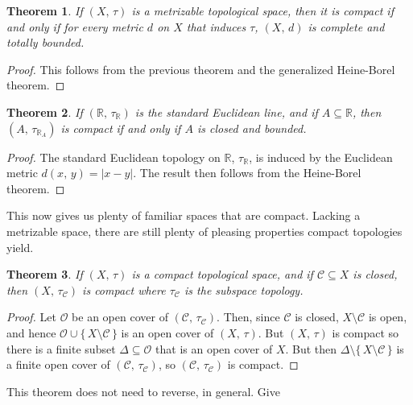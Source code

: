 \documentclass{article}
\theoremstyle{plain}
\newtheorem{theorem}{Theorem}[section]
\theoremstyle{normal}
\begin{document}
        \begin{theorem}
            If $(X,\,\tau)$ is a metrizable topological space, then it is
            compact if and only if for every metric $d$ on $X$ that induces
            $\tau$, $(X,\,d)$ is complete and totally bounded.
        \end{theorem}
        \begin{proof}
            This follows from the previous theorem and the generalized
            Heine-Borel theorem.
        \end{proof}
        \begin{theorem}
            If $(\mathbb{R},\,\tau_{\mathbb{R}})$ is the standard Euclidean
            line, and if $A\subseteq\mathbb{R}$, then
            $(A,\,\tau_{\mathbb{R}_{A}})$ is compact if and only if $A$ is
            closed and bounded.
        \end{theorem}
        \begin{proof}
            The standard Euclidean topology on $\mathbb{R}$,
            $\tau_{\mathbb{R}}$, is induced by the Euclidean metric
            $d(x,\,y)=|x-y|$. The result then follows from the Heine-Borel
            theorem.
        \end{proof}
        This now gives us plenty of familiar spaces that are compact.
        Lacking a metrizable space, there are still plenty of pleasing
        properties compact topologies yield.
        \begin{theorem}
            If $(X,\,\tau)$ is a compact topological space, and if
            $\mathcal{C}\subseteq{X}$ is closed, then
            $(X,\,\tau_{\mathcal{C}})$ is compact where $\tau_{\mathcal{C}}$ is
            the subspace topology.
        \end{theorem}
        \begin{proof}
            Let $\mathcal{O}$ be an open cover of
            $(\mathcal{C},\,\tau_{\mathcal{C}})$. Then, since
            $\mathcal{C}$ is closed, $X\setminus\mathcal{C}$ is open, and
            hence $\mathcal{O}\cup\{\,X\setminus\mathcal{C}\,\}$ is an open
            cover of $(X,\,\tau)$. But $(X,\,\tau)$ is compact so there is a
            finite subset $\Delta\subseteq\mathcal{O}$ that is an open cover
            of $X$. But then $\Delta\setminus\{\,X\setminus\mathcal{C}\,\}$ is
            a finite open cover of $(\mathcal{C},\,\tau_{\mathcal{C}})$, so
            $(\mathcal{C},\,\tau_{\mathcal{C}})$ is compact.
        \end{proof}
        This theorem does not need to reverse, in general. Give
\end{document}
